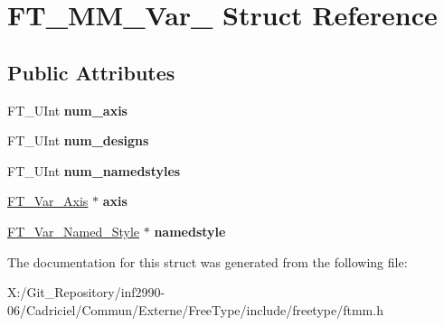 \hypertarget{struct_f_t___m_m___var__}{\section{F\-T\-\_\-\-M\-M\-\_\-\-Var\-\_\- Struct Reference}
\label{struct_f_t___m_m___var__}
}
\subsection*{Public Attributes}
\begin{DoxyCompactItemize}
\item 
\hypertarget{struct_f_t___m_m___var___acd32d4eb128f6fd9f6fde7da4c7b99bf}{F\-T\-\_\-\-U\-Int {\bfseries num\-\_\-axis}}\label{struct_f_t___m_m___var___acd32d4eb128f6fd9f6fde7da4c7b99bf}

\item 
\hypertarget{struct_f_t___m_m___var___a5109a6a20626d90ed44cd64363d29e92}{F\-T\-\_\-\-U\-Int {\bfseries num\-\_\-designs}}\label{struct_f_t___m_m___var___a5109a6a20626d90ed44cd64363d29e92}

\item 
\hypertarget{struct_f_t___m_m___var___ac54bdd53447f4967b5d3b1a341a4bdff}{F\-T\-\_\-\-U\-Int {\bfseries num\-\_\-namedstyles}}\label{struct_f_t___m_m___var___ac54bdd53447f4967b5d3b1a341a4bdff}

\item 
\hypertarget{struct_f_t___m_m___var___a19cc7772e057dad1c4acd6e744328466}{\hyperlink{struct_f_t___var___axis__}{F\-T\-\_\-\-Var\-\_\-\-Axis} $\ast$ {\bfseries axis}}\label{struct_f_t___m_m___var___a19cc7772e057dad1c4acd6e744328466}

\item 
\hypertarget{struct_f_t___m_m___var___acda1ec5211250ddc06ec090f695adabf}{\hyperlink{struct_f_t___var___named___style__}{F\-T\-\_\-\-Var\-\_\-\-Named\-\_\-\-Style} $\ast$ {\bfseries namedstyle}}\label{struct_f_t___m_m___var___acda1ec5211250ddc06ec090f695adabf}

\end{DoxyCompactItemize}


The documentation for this struct was generated from the following file\-:\begin{DoxyCompactItemize}
\item 
X\-:/\-Git\-\_\-\-Repository/inf2990-\/06/\-Cadriciel/\-Commun/\-Externe/\-Free\-Type/include/freetype/ftmm.\-h\end{DoxyCompactItemize}
